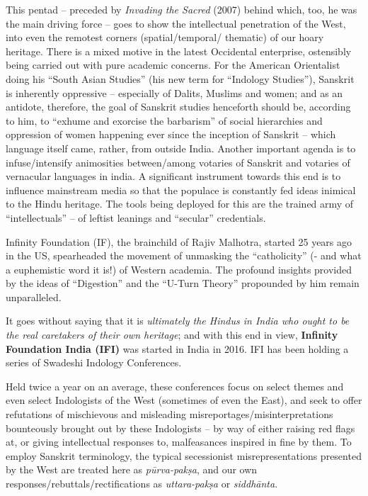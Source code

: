 This pentad – preceded by \textit{Invading the Sacred} (2007) behind which, too, he was the main driving force – goes to show the intellectual penetration of the West, into even the remotest corners (spatial/temporal/ thematic) of our hoary heritage. There is a mixed motive in the latest Occidental enterprise, ostensibly being carried out with pure academic concerns. For the American Orientalist doing his “South Asian Studies” (his new term for “Indology Studies”), Sanskrit is inherently oppressive – especially of Dalits, Muslims and women; and as an antidote, therefore, the goal of Sanskrit studies henceforth should be, according to him, to “exhume and exorcise the barbarism” of social hierarchies and oppression of women happening ever since the inception of Sanskrit – which language itself came, rather, from outside India. Another important agenda is to infuse/intensify animosities between/among votaries of Sanskrit and votaries of vernacular languages in india. A significant instrument towards this end is to influence mainstream media so that the populace is constantly fed ideas inimical to the Hindu heritage. The tools being deployed for this are the trained army of “intellectuals” – of leftist leanings and “secular” credentials.

Infinity Foundation (IF), the brainchild of Rajiv Malhotra, started 25 years ago in the US, spearheaded the movement of unmasking the “catholicity” (- and what a euphemistic word it is!) of Western academia. The profound insights provided by the ideas of “Digestion” and the “U-Turn Theory” propounded by him remain unparalleled.

It goes without saying that it is \textit{ultimately the Hindus in India who ought to be the real caretakers of their own heritage}; and with this end in view, \textbf{Infinity Foundation India (IFI)} was started in India in 2016. IFI has been holding a series of Swadeshi Indology Conferences. 

Held twice a year on an average, these conferences focus on select themes and even select Indologists of the West (sometimes of even the East), and seek to offer refutations of mischievous and misleading misreportages/misinterpretations bounteously brought out by these Indologists – by way of either raising red flags at, or giving intellectual responses to, malfeasances inspired in fine by them. To employ Sanskrit terminology, the typical secessionist misrepresentations presented by the West are treated here as \textit{pūrva-pakṣa}, and our own responses/rebuttals/rectifications as \textit{uttara-pakṣa} or \textit{siddhānta}. 


